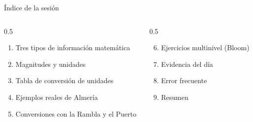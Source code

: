 \documentclass[aspectratio=169, 10pt, spanish]{beamer}
\begin{document}
\begin{frame}[plain]
  \titlepage
\end{frame}

\begin{frame}{Índice de la sesión}
  \begin{columns}[t]
    \begin{column}{0.5\textwidth}
      \begin{enumerate}
        \item Tres tipos de información matemática
        \item Magnitudes y unidades
        \item Tabla de conversión de unidades
        \item Ejemplos reales de Almería
        \item Conversiones con la Rambla y el Puerto
      \end{enumerate}
    \end{column}
    \begin{column}{0.5\textwidth}
      \begin{enumerate}
        \setcounter{enumi}{5}
        \item Ejercicios multinivel (Bloom)
        \item Evidencia del día
        \item Error frecuente
        \item Resumen
      \end{enumerate}
    \end{column}
  \end{columns}
\end{frame}

\end{document}
